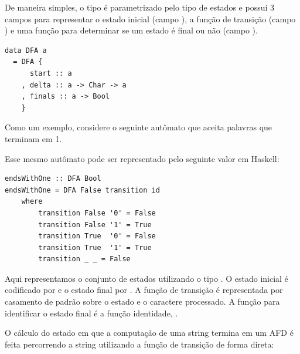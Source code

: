 De maneira simples, o tipo  é
parametrizado pelo tipo de estados e possui 3 campos para representar
o estado inicial (campo ), a função de
transição (campo ) e uma função para
determinar se um estado é final ou não (campo ).

\begin{verbatim}
data DFA a
  = DFA {
      start :: a
    , delta :: a -> Char -> a
    , finals :: a -> Bool
    }
\end{verbatim}

Como um exemplo, considere o seguinte autômato que aceita palavras
que terminam em 1.

\begin{figure}[H]
  \centering
\end{figure}

Esse mesmo autômato pode ser representado pelo seguinte valor em Haskell:

\begin{verbatim}
endsWithOne :: DFA Bool
endsWithOne = DFA False transition id
    where
        transition False '0' = False
        transition False '1' = True
        transition True  '0' = False
        transition True  '1' = True
        transition _ _ = False
\end{verbatim}

Aqui representamos o conjunto de estados utilizando o tipo
. O estado inicial é codificado por
 e o estado final por
. A função de transição é representada
por casamento de padrão sobre o estado e o caractere processado. A
função para identificar o estado final é a função identidade,
.

O cálculo do estado em que a computação de uma string termina em um
AFD é feita percorrendo a string utilizando a função de transição de
forma direta:

